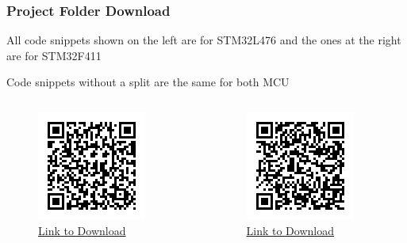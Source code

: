 \documentclass{beamer}
\begin{document}
\begin{frame}
  \frametitle{Project Folder Download}
  \alert{All code snippets shown on the left are for STM32L476 and the ones at the right are for STM32F411}

  \alert{Code snippets without a split are the same for both MCU}
  \begin{columns}[t]
    \begin{column}{.5\textwidth}
      \begin{figure}
        \includegraphics[width=.5\textwidth]{media/l476-qrcode.png}
        \caption{\href{https://github.com/IEEE-UNM/scrolling-game/archive/refs/heads/initial-project.zip}{Link to Download}}
      \end{figure}
    \end{column}
    \begin{column}{.5\textwidth}
      \begin{figure}
        \includegraphics[width=.5\textwidth]{media/f411-qrcode.png}
        \caption{\href{https://github.com/IEEE-UNM/scrolling-game/archive/refs/heads/initial-project-f4.zip}{Link to Download}}
      \end{figure}
    \end{column}
  \end{columns}
\end{frame}
\end{document}
